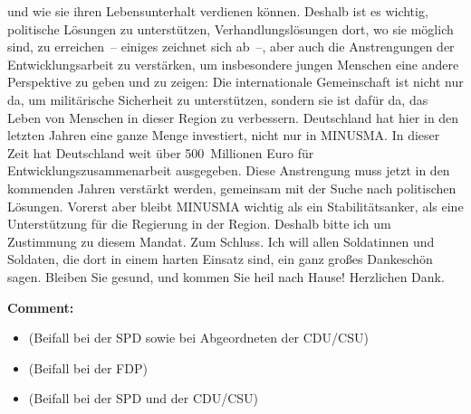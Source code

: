 \documentclass{article}
\begin{document}
und wie sie ihren Lebensunterhalt verdienen können. Deshalb ist es wichtig, politische Lösungen zu unterstützen, Verhandlungslösungen dort, wo sie möglich sind, zu erreichen – einiges zeichnet sich ab –, aber auch die Anstrengungen der Entwicklungsarbeit zu verstärken, um insbesondere jungen Menschen eine andere Perspektive zu geben und zu zeigen: Die internationale Gemeinschaft ist nicht nur da, um militärische Sicherheit zu unterstützen, sondern sie ist dafür da, das Leben von Menschen in dieser Region zu verbessern. Deutschland hat hier in den letzten Jahren eine ganze Menge investiert, nicht nur in MINUSMA. In dieser Zeit hat Deutschland weit über 500 Millionen Euro für Entwicklungszusammenarbeit ausgegeben. Diese Anstrengung muss jetzt in den kommenden Jahren verstärkt werden, gemeinsam mit der Suche nach politischen Lösungen. Vorerst aber bleibt MINUSMA wichtig als ein Stabilitätsanker, als eine Unterstützung für die Regierung in der Region. Deshalb bitte ich um Zustimmung zu diesem Mandat. Zum Schluss. Ich will allen Soldatinnen und Soldaten, die dort in einem harten Einsatz sind, ein ganz großes Dankeschön sagen. Bleiben Sie gesund, und kommen Sie heil nach Hause! Herzlichen Dank.  

\noindent\textbf{Comment:}
\begin{itemize}
    \setlength\itemsep{-3pt}
    \item (Beifall bei der SPD sowie bei Abgeordneten der CDU/CSU)
    \setlength\itemsep{-3pt}
    \item (Beifall bei der FDP)
    \setlength\itemsep{-3pt}
    \item (Beifall bei der SPD und der CDU/CSU)
\end{itemize}
\end{document}
